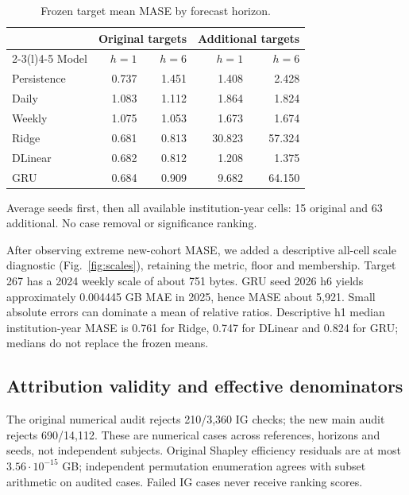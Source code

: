 \documentclass[conference]{IEEEtran}
\begin{document}
\begin{table}[t]\centering
\caption{Frozen target mean MASE by forecast horizon.}\label{tab:forecast}
\small
\renewcommand{\arraystretch}{1.15}
\begin{tabular*}{\columnwidth}{@{\extracolsep{\fill}}lrrrr@{}}\toprule
&\multicolumn{2}{c}{Original targets}&\multicolumn{2}{c}{Additional targets}\\
\cmidrule(lr){2-3}\cmidrule(l){4-5}
Model&$h=1$&$h=6$&$h=1$&$h=6$\\\midrule
Persistence&0.737&1.451&1.408&2.428\\
Daily&1.083&1.112&1.864&1.824\\
Weekly&1.075&1.053&1.673&1.674\\
\addlinespace[4pt]
Ridge&0.681&0.813&30.823&57.324\\
DLinear&0.682&0.812&1.208&1.375\\
GRU&0.684&0.909&9.682&64.150\\\bottomrule
\end{tabular*}
\par\smallskip\raggedright\footnotesize
Average seeds first, then all available institution-year cells: 15 original and 63 additional. No case removal or significance ranking.
\end{table}

After observing extreme new-cohort MASE, we added a descriptive all-cell scale diagnostic (Fig.~\ref{fig:scales}), retaining the metric, floor and membership. Target 267 has a 2024 weekly scale of about 751 bytes. GRU seed 2026 h6 yields approximately 0.004445 GB MAE in 2025, hence MASE about 5,921. Small absolute errors can dominate a mean of relative ratios. Descriptive h1 median institution-year MASE is 0.761 for Ridge, 0.747 for DLinear and 0.824 for GRU; medians do not replace the frozen means.



\subsection{Attribution validity and effective denominators}
The original numerical audit rejects 210/3,360 IG checks; the new main audit rejects 690/14,112. These are numerical cases across references, horizons and seeds, not independent subjects. Original Shapley efficiency residuals are at most $3.56\cdot10^{-15}$ GB; independent permutation enumeration agrees with subset arithmetic on audited cases. Failed IG cases never receive ranking scores.
\end{document}
